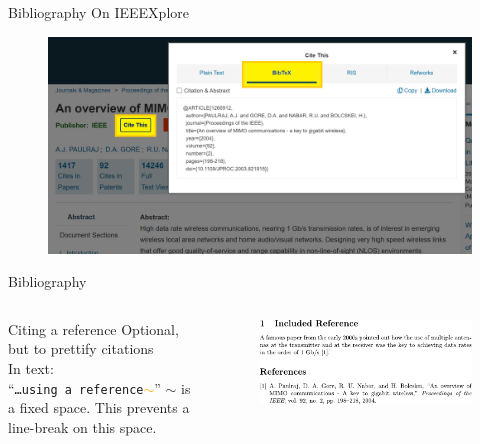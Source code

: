 \begin{frame}[fragile]{Bibliography}
On IEEEXplore
	\begin{figure}
		\includegraphics[width=.7\linewidth]{Figures/bib_1}
	\end{figure}
\end{frame}

\begin{frame}[fragile]{Bibliography}
    \begin{columns}[t]
		\begin{column}{.5\textwidth}
			Citing a reference
        \somespace
	Optional, but to prettify citations \\  
	\somespace
	In text: 
	\\``\texttt{\ldots using a reference\textcolor{orange}{$\mathbf\sim$}}''
	\somespace
	$\sim$ is a fixed space. This prevents a line-break on this space. 
    \somespace
		\end{column}
		\begin{column}{.5\textwidth}
			\begin{figure}
			\includegraphics[width=.9\linewidth, frame, trim={-1cm -1cm -1cm -1cm},clip]{Figures/doc10}
			\end{figure}
		\end{column}
	\end{columns}
\end{frame}

